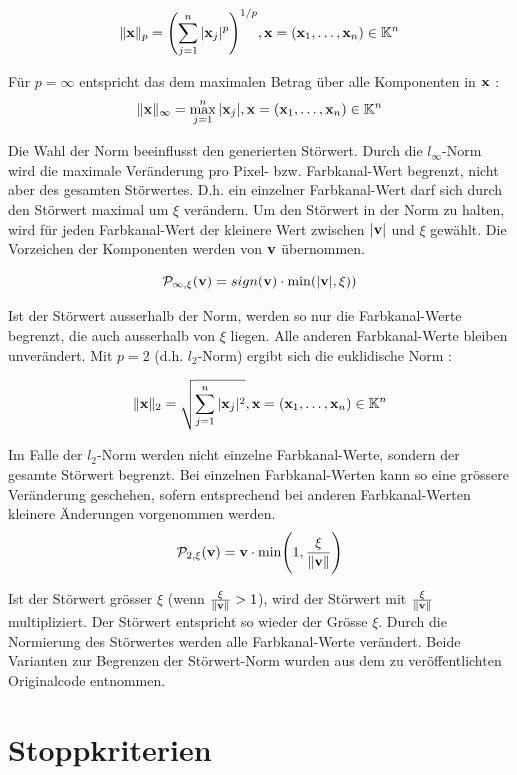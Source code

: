 \documentclass{FFHS_Thesis_Additions/ffhsthesis}
\begin{document}
\[
\Vert \bold{x} \Vert_p = \Biggl(\sum_{j=1}^n \vert \bold{x}_j \vert^p \Biggl)^{1/p}, \bold{x} = (\bold{x}_1, \dots, \bold{x}_n) \in \mathbb{K}^n
\]


Für $p=\infty$ entspricht das dem maximalen Betrag über alle Komponenten in $\bold{x}$ \cite{kaballo_grundkurs_2018}:
\[
\Vert \bold{x} \Vert_\infty = \max_{j=1}^n \vert \bold{x}_j \vert, \bold{x} = (\bold{x}_1, \dots, \bold{x}_n) \in \mathbb{K}^n
\]

Die Wahl der Norm beeinflusst den generierten Störwert. 
Durch die $l_\infty$-Norm wird die maximale Veränderung pro Pixel- bzw. Farbkanal-Wert begrenzt, nicht aber des gesamten Störwertes. 
D.h. ein einzelner Farbkanal-Wert darf sich durch den Störwert maximal um $\xi$ verändern. 
Um den Störwert in der Norm zu halten, wird für jeden Farbkanal-Wert der kleinere Wert zwischen $\vert \bold{v} \vert$ und $\xi$ gewählt. 
Die Vorzeichen der Komponenten werden von $\bold{v}$ übernommen. 

\[
\mathcal{P}_{\infty,\xi}(\bold{v}) = sign(\bold{v}) \cdot \min(|\bold{v}|, \xi)) 
\]

Ist der Störwert ausserhalb der Norm, werden so nur die Farbkanal-Werte begrenzt, die auch ausserhalb von $\xi$ liegen. Alle anderen Farbkanal-Werte bleiben unverändert.
Mit $p=2$ (d.h. $l_2$-Norm) ergibt sich die euklidische Norm \cite{kaballo_grundkurs_2018}:

\[
\Vert \bold{x} \Vert_2 = \sqrt{\sum_{j=1}^n \vert \bold{x}_j \vert^2 }, \bold{x} = (\bold{x}_1, \dots, \bold{x}_n) \in \mathbb{K}^n
\]

 Im Falle der $l_2$-Norm werden nicht einzelne Farbkanal-Werte, sondern der gesamte Störwert begrenzt.
Bei einzelnen Farbkanal-Werten kann so eine grössere Veränderung geschehen, sofern entsprechend bei anderen Farbkanal-Werten kleinere Änderungen vorgenommen werden.
\[
\mathcal{P}_{2,\xi}(\bold{v}) = \bold{v} \cdot \min\Biggl(1, \frac{\xi}{ \Vert \bold{v} \Vert}\Biggl) 
\]

Ist der Störwert grösser $\xi$ (wenn $\frac{\xi}{ \Vert \bold{v} \Vert} > 1$), wird der Störwert mit $\frac{\xi}{ \Vert \bold{v} \Vert}$ multipliziert. Der Störwert entspricht so wieder der Grösse $\xi$. Durch die Normierung des Störwertes werden alle Farbkanal-Werte verändert. Beide Varianten zur Begrenzen der Störwert-Norm wurden aus dem zu \cite{moosavi-dezfooli_universal_2017-1} veröffentlichten Originalcode entnommen.

\section{Stoppkriterien}
\end{document}
